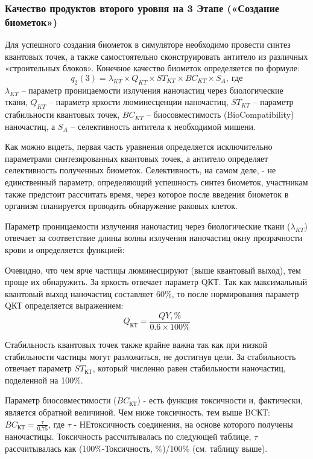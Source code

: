 \subsubsection*{Качество продуктов второго уровня на 3 Этапе («Создание биометок»)}

Для успешного создания биометок в симуляторе необходимо провести синтез квантовых точек, а также самостоятельно сконструировать антитело из различных «строительных блоков». Конечное качество биометок определяется по формуле:
$$q_2 (3)=\lambda_{KT} \times Q_{KT} \times ST_{KT} \times BC_{KT} \times S_A, \: \text{где}$$
$\lambda_{KT}$ – параметр проницаемости излучения наночастиц через биологические ткани, $Q_{KT}$ – параметр яркости люминесценции наночастиц, $ST_{KT}$ – параметр стабильности квантовых точек, $BC_{KT}$ – биосовместимость (BioCompatibility) наночастиц, а $S_A$ – селективность антитела к необходимой мишени.

Как можно видеть, первая часть уравнения определяется исключительно параметрами синтезированных квантовых точек, а антитело определяет селективность полученных биометок. Селективность, на самом деле, - не единственный параметр, определяющий успешность синтез биометок, участникам также предстоит рассчитать время, через которое после введения биометок в организм планируется проводить обнаружение раковых клеток.

Параметр проницаемости излучения наночастиц через биологические ткани ($\lambda_{KT}$) отвечает за соответствие длины волны излучения наночастиц окну прозрачности крови и определяется функцией:

 
Очевидно, что чем ярче частицы люминесцируют (выше квантовый выход), тем проще их обнаружить. За яркость отвечает параметр QКТ. Так как максимальный квантовый выход наночастиц составляет 60\%, то после нормирования параметр QКТ определяется выражением:
$$Q_{КТ}=\frac{QY,\%}{0.6\times 100\%}$$

Стабильность квантовых точек также крайне важна так как при низкой стабильности частицы могут разложиться, не достигнув цели. За стабильность отвечает параметр $ST_{КТ}$, который численно равен стабильности наночастиц, поделенной на 100\%.

Параметр биосовместимости ($BC_{КТ}$) - есть функция токсичности и, фактически, является обратной величиной. Чем ниже токсичность, тем выше BCКТ: $BC_{КТ}=\frac{\tau}{0.75}$, где $\tau$ - НЕтоксичность соединения, на основе которого получены наночастицы. Токсичность рассчитывалась по следующей таблице, $\tau$ рассчитывалась как (100\%-Токсичность, \%)/100\% (см. таблицу выше).


